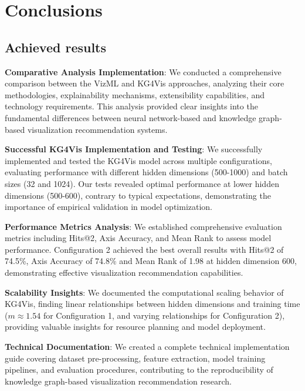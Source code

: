 
\section{Conclusions}


	
\subsection{Achieved results} 	

\vspace{1em}
\noindent \textbf{Comparative Analysis Implementation}: We conducted a comprehensive comparison between the VizML and KG4Vis approaches, analyzing their core methodologies, explainability mechanisms, extensibility capabilities, and technology requirements. This analysis provided clear insights into the fundamental differences between neural network-based and knowledge graph-based visualization recommendation systems.

\vspace{1em}
\noindent \textbf{Successful KG4Vis Implementation and Testing}: We successfully implemented and tested the KG4Vis model across multiple configurations, evaluating performance with different hidden dimensions (500-1000) and batch sizes (32 and 1024). Our tests revealed optimal performance at lower hidden dimensions (500-600), contrary to typical expectations, demonstrating the importance of empirical validation in model optimization.

\vspace{1em}
\noindent \textbf{Performance Metrics Analysis}: We established comprehensive evaluation metrics including Hits@2, Axis Accuracy, and Mean Rank to assess model performance. Configuration 2 achieved the best overall results with Hits@2 of 74.5\%, Axis Accuracy of 74.8\% and Mean Rank of 1.98 at hidden dimension 600, demonstrating effective visualization recommendation capabilities.

\vspace{1em}
\noindent \textbf{Scalability Insights}: We documented the computational scaling behavior of KG4Vis, finding linear relationships between hidden dimensions and training time ($m \approx 1.54$ for Configuration 1, and varying relationships for Configuration 2), providing valuable insights for resource planning and model deployment.

\vspace{1em}
\noindent \textbf{Technical Documentation}: We created a complete technical implementation guide covering dataset pre-processing, feature extraction, model training pipelines, and evaluation procedures, contributing to the reproducibility of knowledge graph-based visualization recommendation research.

